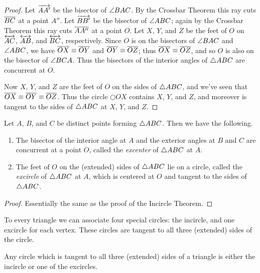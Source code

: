 \begin{proof}
Let \(\overrightarrow{AA'}\) be the bisector of \(\angle{BAC}\).
By the Crossbar Theorem this ray cuts \(\overline{BC}\) at a point \(A''\).
Let \(\overrightarrow{BB'}\) be the bisector of \(\angle{ABC}\); again by the Crossbar Theorem this ray cuts \(\overline{AA''}\) at a point \(O\).
Let \(X\), \(Y\), and \(Z\) be the feet of \(O\) on \(\overleftrightarrow{AC}\), \(\overleftrightarrow{AB}\), and \(\overleftrightarrow{BC}\), respectively.
Since \(O\) is on the bisectors of \(\angle{BAC}\) and \(\angle{ABC}\), we have \(\overline{OX} \equiv \overline{OY}\) and \(\overline{OY} \equiv \overline{OZ}\); thus \(\overline{OX} \equiv \overline{OZ}\), and so \(O\) is also on the bisector of \(\angle{BCA}\).
Thus the bisectors of the interior angles of \(\bigtriangleup{ABC}\) are concurrent at \(O\).

Now \(X\), \(Y\), and \(Z\) are the feet of \(O\) on the sides of \(\bigtriangleup{ABC}\), and we've seen that \(\overline{OX} \equiv \overline{OY} \equiv \overline{OZ}\).
Thus the circle \(\Circle{O}{X}\) contains \(X\), \(Y\), and \(Z\), and moreover is tangent to the sides of \(\bigtriangleup{ABC}\) at \(X\), \(Y\), and \(Z\).
\end{proof}

\begin{construct}
Let \(A\), \(B\), and \(C\) be distinct points forming \(\bigtriangleup{ABC}\).
Then we have the following.
\begin{enumerate}
\item The bisector of the interior angle at \(A\) and the exterior angles at \(B\) and \(C\) are concurrent at a point \(O\), called the \emph{excenter} of \(\bigtriangleup{ABC}\) at \(A\).

\item The feet of \(O\) on the (extended) sides of \(\bigtriangleup{ABC}\) lie on a circle, called the \emph{excircle} of \(\bigtriangleup{ABC}\) at \(A\), which is centered at \(O\) and tangent to the sides of \(\bigtriangleup{ABC}\).
\end{enumerate}
\end{construct}

\begin{proof}
Essentially the same as the proof of the Incircle Theorem.
\end{proof}

To every triangle we can associate four special circles: the incircle, and one excircle for each vertex.
These circles are tangent to all three (extended) sides of the circle.

\begin{prop}
Any circle which is tangent to all three (extended) sides of a triangle is either the incircle or one of the excircles.
\end{prop}
